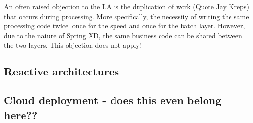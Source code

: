 An often raised objection to the LA is the duplication of work (Quote Jay Kreps) that occurs during processing. More specifically, the necessity of writing the same processing code twice: once for the speed and once for the batch layer. However, due to the nature of Spring XD, the same business code can be shared between the two layers. This objection does not apply!


\subsection {Reactive architectures}

\subsection {Cloud deployment - does this even belong here??}
